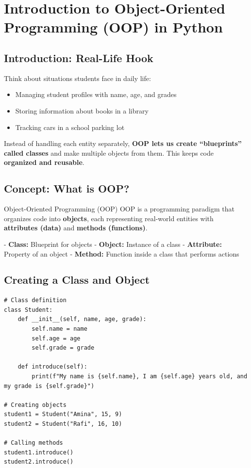 \chapter{Introduction to Object-Oriented Programming (OOP) in Python}

\section{Introduction: Real-Life Hook}

Think about situations students face in daily life:

\begin{itemize}
    \item Managing student profiles with name, age, and grades  
    \item Storing information about books in a library  
    \item Tracking cars in a school parking lot  
\end{itemize}

Instead of handling each entity separately, \textbf{OOP lets us create “blueprints” called classes} and make multiple objects from them. This keeps code \textbf{organized and reusable}.

\section{Concept: What is OOP?}

\begin{definition}{Object-Oriented Programming (OOP)}
OOP is a programming paradigm that organizes code into \textbf{objects}, each representing real-world entities with \textbf{attributes (data)} and \textbf{methods (functions)}.
\end{definition}

- \textbf{Class:} Blueprint for objects  
- \textbf{Object:} Instance of a class  
- \textbf{Attribute:} Property of an object  
- \textbf{Method:} Function inside a class that performs actions  

\section{Creating a Class and Object}

\begin{verbatim}
# Class definition
class Student:
    def __init__(self, name, age, grade):
        self.name = name
        self.age = age
        self.grade = grade

    def introduce(self):
        print(f"My name is {self.name}, I am {self.age} years old, and my grade is {self.grade}")

# Creating objects
student1 = Student("Amina", 15, 9)
student2 = Student("Rafi", 16, 10)

# Calling methods
student1.introduce()
student2.introduce()
\end{verbatim}

